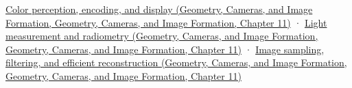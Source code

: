 \href{../03-Geometry-Cameras-and-Image-Formation/main.pdf\#nameddest=03-visual-computing-i-ch004-color-perception-encoding-and-display}{Color perception, encoding, and display (Geometry, Cameras, and Image Formation, Geometry, Cameras, and Image Formation, Chapter 11)} · \href{../03-Geometry-Cameras-and-Image-Formation/main.pdf\#nameddest=03-visual-computing-i-ch004-light-measurement-and-radiometry}{Light measurement and radiometry (Geometry, Cameras, and Image Formation, Geometry, Cameras, and Image Formation, Chapter 11)} · \href{../03-Geometry-Cameras-and-Image-Formation/main.pdf\#nameddest=03-visual-computing-i-ch004-image-sampling-filtering-and-efficient-reconstruction}{Image sampling, filtering, and efficient reconstruction (Geometry, Cameras, and Image Formation, Geometry, Cameras, and Image Formation, Chapter 11)}
